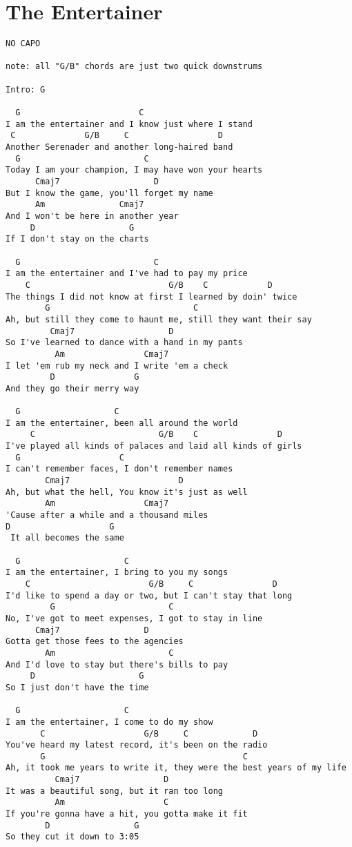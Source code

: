 \documentclass[leqno]{memoir}
\begin{document}
\chapter{The Entertainer}
\begin{verbatim}
NO CAPO

note: all "G/B" chords are just two quick downstrums

Intro: G

  G                        C 
I am the entertainer and I know just where I stand
 C              G/B     C                  D      
Another Serenader and another long-haired band
  G                         C
Today I am your champion, I may have won your hearts
      Cmaj7                   D
But I know the game, you'll forget my name
      Am               Cmaj7 
And I won't be here in another year
     D                   G 
If I don't stay on the charts

  G                           C
I am the entertainer and I've had to pay my price
    C                            G/B    C            D 
The things I did not know at first I learned by doin' twice
        G                             C
Ah, but still they come to haunt me, still they want their say
         Cmaj7                   D
So I've learned to dance with a hand in my pants
          Am                Cmaj7
I let 'em rub my neck and I write 'em a check
         D                G 
And they go their merry way

  G                   C 
I am the entertainer, been all around the world
     C                         G/B    C                D    
I've played all kinds of palaces and laid all kinds of girls
  G                    C 
I can't remember faces, I don't remember names
        Cmaj7                      D
Ah, but what the hell, You know it's just as well
        Am                  Cmaj7 
'Cause after a while and a thousand miles
D                    G
 It all becomes the same

  G                     C 
I am the entertainer, I bring to you my songs
    C                        G/B     C                D 
I'd like to spend a day or two, but I can't stay that long
         G                       C
No, I've got to meet expenses, I got to stay in line
      Cmaj7                 D
Gotta get those fees to the agencies
        Am                       C
And I'd love to stay but there's bills to pay
     D                     G 
So I just don't have the time

  G                     C 
I am the entertainer, I come to do my show
       C                    G/B     C             D
You've heard my latest record, it's been on the radio
       G                                        C
Ah, it took me years to write it, they were the best years of my life
          Cmaj7                 D
It was a beautiful song, but it ran too long
          Am                    C
If you're gonna have a hit, you gotta make it fit
        D                 G
So they cut it down to 3:05


\end{verbatim}
\end{document}

